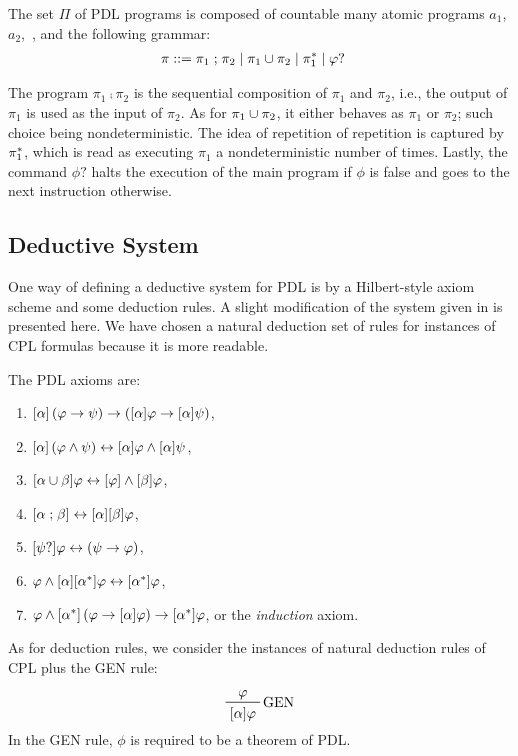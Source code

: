 \begin{definition}
The set $\Pi$ of  PDL programs is composed of countable many atomic programs $a_1$, $a_2$,~\etc, and the following grammar:
%
\begin{align*}
    \pi & \mathrel{::=} \pi_1\mathrel{;} \pi_2 \mid \pi_1\cup \pi_2 \mid \pi^*_1 \mid \varphi?
\end{align*}
\end{definition}
%
The program $\pi_1\comp \pi_2$ is the sequential composition of $\pi_1$ and $\pi_2$, i.e., the output of $\pi_1$ is used as the input of $\pi_2$. As for $\pi_1 \cup \pi_2$, it either behaves as $\pi_1$ or $\pi_2$; such choice being nondeterministic. The idea of repetition of repetition is captured by $\pi^*_1$, which is read as executing $\pi_1$ a nondeterministic number of times. Lastly, the command $\phi?$ halts the execution of the main program if $\phi$ is false and goes to the next instruction otherwise.

\subsection{Deductive System}
One way of defining a deductive system for PDL is by a Hilbert-style axiom scheme and some deduction rules. A slight modification of the system given in \cite{harel2001dl} is presented here. We have chosen a natural deduction set of rules for instances of CPL formulas because it is more readable.

\begin{definition}
The PDL axioms are:
\begin{enumerate}[label=({A\arabic*})]
    \item $[\alpha] \left({\varphi \to \psi}\right) \to \left([\alpha] \varphi \to [\alpha] \psi\right)$,
    \item $[\alpha] \left(\varphi\land\psi\right) \leftrightarrow [\alpha] \varphi \land [\alpha] \psi$,
    \item $[\alpha\cup\beta] \varphi \leftrightarrow [\varphi] \land[\beta] \varphi$,
    \item $[\alpha\mathrel{;}\beta] \leftrightarrow[\alpha] [\beta] \varphi$,
    \item $[\psi?] \varphi\leftrightarrow(\psi\to\varphi)$,
    \item $\varphi\land[\alpha] [\alpha^*] \varphi \leftrightarrow [\alpha^*] \varphi$,
    \item \label{item:pdlaxiom_induction} $\varphi\land[\alpha^*] \left(\varphi\to[\alpha] \varphi\right)\to[\alpha^*] \varphi$, or the \emph{induction} axiom.
\end{enumerate}
As for deduction rules, we consider the instances of natural deduction rules of CPL plus the GEN rule:
%
\begin{displaymath}
\prftree[r]{GEN}{\phi}{\necess{\alpha}{\phi}}
\end{displaymath}
%
In the GEN rule, $\phi$ is required to be a theorem of PDL.
\end{definition}

